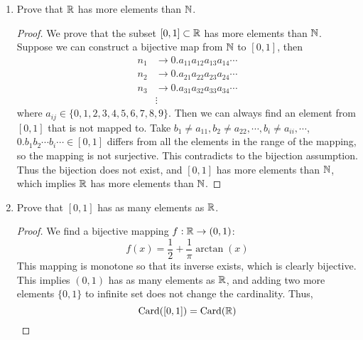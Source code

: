 \begin{enumerate}
\begin{proof}
	\end{proof}
    \item Prove that $\mathbb{R}$ has more elements than $\mathbb{N}$.
	\begin{proof}
	We prove that the subset \([0,1]\subset\mathbb{R}\) has more elements than $\mathbb{N}$.
	Suppose we can construct a bijective map from $\mathbb{N}$ to \([0,1]\), then
	\begin{align*}
	n_1 &\to 0.a_{11}a_{12}a_{13}a_{14}\cdots\\
	n_2 &\to 0.a_{21}a_{22}a_{23}a_{24}\cdots\\
	n_3 &\to 0.a_{31}a_{32}a_{33}a_{34}\cdots\\
	&\vdots
	\end{align*}
	where \(a_{ij}\in\{0,1,2,3,4,5,6,7,8,9\}\).
	Then we can always find an element from \([0,1]\) that is not mapped to.
	Take \(b_1\neq a_{11},b_2\neq a_{22},\cdots,b_i\neq a_{ii},\cdots\), \(0.b_1 b_2 \cdots b_i\cdots\in[0,1]\) differs from all the elements in the range of the mapping, so the mapping is not surjective.
	This contradicts to the bijection assumption.
	Thus the bijection does not exist, and \([0,1]\) has more elements than $\mathbb{N}$, which implies $\mathbb{R}$ has more elements than $\mathbb{N}$.
	\end{proof}
    \item Prove that \([0, 1]\) has as many elements as $\mathbb{R}$.
	\begin{proof}
	We find a bijective mapping \(f:\mathbb{R}\to(0,1)\):
	\[f(x)=\frac{1}{2}+\frac{1}{\pi}\arctan(x) \]
	This mapping is monotone so that its inverse exists, which is clearly bijective.
	This implies \((0,1)\) has as many elements as $\mathbb{R}$, and adding two more elements \(\{0,1\}\) to infinite set does not change the cardinality.
	Thus,
	\[\mathrm{Card}([0,1])=\mathrm{Card}(\mathbb{R})\]
	\end{proof}
\end{enumerate}


